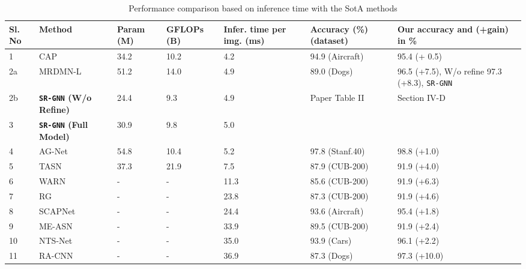 \documentclass[journal]{IEEEtran}
\begin{document}
\begin{table*} [!h]
\begin{center}

 \caption{Performance comparison based on inference time with the SotA methods}
 \label{table:InfT}
\begin{tabular}{|p{5.5 mm}| p{30 mm} p{14 mm} p{15 mm}p{19 mm} p{25 mm} p{34 mm} |}
 \hline
Sl. No & Method & Param (M) & GFLOPs (B) &
 Infer. time per img. (ms) & Accuracy (\%) (dataset) & Our accuracy and (+gain) in \% \\
\hline
1 &	CAP \cite{behera2021context} & 34.2 & 10.2 &	4.2 &	94.9 (Aircraft) &	95.4 (+ 0.5) \\  \hline
2a &	MRDMN-L \cite{xu2021multiresolution} & 51.2 &	14.0 &	4.9 &	89.0 (Dogs) &	96.5 (+7.5), W/o refine  97.3 (+8.3), \texttt{\texttt{SR-GNN}} \\  \hline
2b & \textbf{\texttt{SR-GNN} (W/o Refine)}& 24.4 &	9.3	 &4.9 &	 Paper Table II &	Section IV-D \\  3 &	\textbf{\texttt{SR-GNN}  (Full Model)}  & 30.9 &	9.8 &	5.0	 &	 &	 \\  \hline
4 &	AG-Net \cite{bera2021attend} & 54.8 &10.4
 &	5.2 &	97.8 (Stanf.40) &	98.8 (+1.0) \\  \hline
5 &	TASN \cite{zheng2019looking} & 37.3 &	21.9 &	7.5	 &87.9 (CUB-200) &	91.9 (+4.0) \\  \hline
6 &	WARN \cite{lopez2020pay} & - &-  &	11.3 &	85.6 (CUB-200) &	91.9 (+6.3) \\  \hline
7&	RG \cite{huang2020interpretable} & - &-	 &23.8 &	87.3 (CUB-200) &	91.9 (+4.6) \\  \hline
8 &	SCAPNet \cite{liu2021learning} & - &- &	24.4 &	93.6 (Aircraft) &	95.4 (+1.8) \\  \hline
9 &	ME-ASN \cite{zhang2021enhancing} & - &- &	33.9 &	89.5 (CUB-200) &	91.9 (+2.4) \\  \hline
10 &	NTS-Net \cite{yang2018learning} & - &- &	35.0 &	93.9 (Cars) &	96.1 (+2.2) \\  \hline
11 &	RA-CNN \cite{fu2017look} & - &- &	36.9 &	87.3 (Dogs)	 &97.3 (+10.0) \\  \hline
\end{tabular}
 \end{center}
\end{table*}
\end{document}
